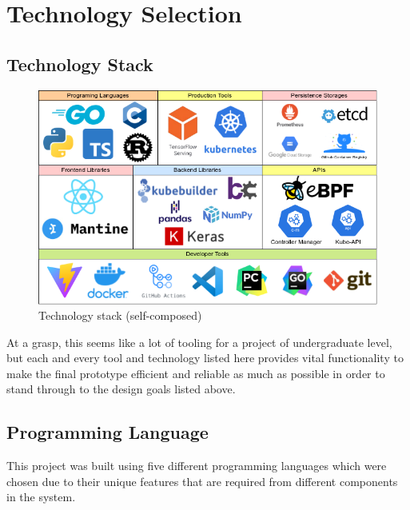 \section{Technology Selection}
\subsection{Technology Stack}

\begin{figure}[H] 
    \includegraphics[width=13cm]{assets/implementation/technology-stack.png}
    \caption{Technology stack (self-composed)}
    \label{fig:technology-stack}
\end{figure}

At a grasp, this seems like a lot of tooling for a project of undergraduate level, but each and every tool and technology listed here provides vital functionality to make the final prototype efficient and reliable as much as possible in order to stand through to the design goals listed above.

\subsection{Programming Language}

This project was built using five different programming languages which were chosen due to their unique features that are required from different components in the system.

